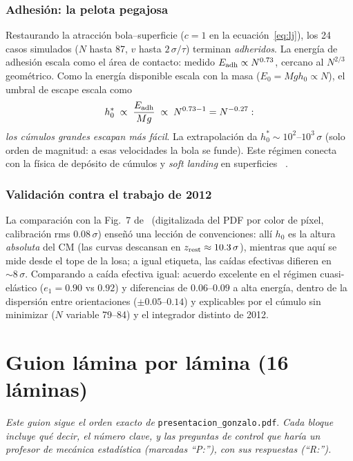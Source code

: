 \documentclass[11pt,a4paper]{article}
\begin{document}
\section{Adhesión: la pelota pegajosa}

Restaurando la atracción bola--superficie ($c=1$ en la
ecuación~\ref{eq:lj}), los 24 casos simulados ($N$ hasta 87, $v$ hasta
$2\,\sigma/\tau$) terminan \emph{adheridos}. La energía de adhesión escala
como el área de contacto: medido $E_{\rm adh} \propto N^{0.73}$, cercano al
$N^{2/3}$ geométrico. Como la energía disponible escala con la masa
($E_0 = Mgh_0 \propto N$), el umbral de escape escala como
\begin{equation}
h_0^* \;\propto\; \frac{E_{\rm adh}}{Mg} \;\propto\; N^{0.73-1} = N^{-0.27}:
\end{equation}
\emph{los cúmulos grandes escapan más fácil}. La extrapolación da
$h_0^* \sim 10^2$--$10^3\,\sigma$ (solo orden de magnitud: a esas
velocidades la bola se funde). Este régimen conecta con la física de
depósito de cúmulos y \emph{soft landing} en superficies
~\cite{Haberland1994,Awasthi2007}.

\section{Validación contra el trabajo de 2012}

La comparación con la Fig.~7 de~\cite{Gutierrez2012} (digitalizada del PDF
por color de píxel, calibración rms $0.08\,\sigma$) enseñó una lección de
convenciones: allí $h_0$ es la altura \emph{absoluta} del CM (las curvas
descansan en $z_{\rm rest}\approx10.3\,\sigma$), mientras que aquí se mide
desde el tope de la losa; a igual etiqueta, las caídas efectivas difieren
en $\sim8\,\sigma$. Comparando a caída efectiva igual: acuerdo excelente en
el régimen cuasi-elástico ($e_1 = 0.90$ vs $0.92$) y diferencias de
$0.06$--$0.09$ a alta energía, dentro de la dispersión entre orientaciones
($\pm0.05$--$0.14$) y explicables por el cúmulo sin minimizar ($N$ variable
79--84) y el integrador distinto de 2012.

\part{Guion lámina por lámina (16 láminas)}

\emph{Este guion sigue el orden exacto de} \texttt{presentacion\_gonzalo.pdf}.
\emph{Cada bloque incluye qué decir, el número clave, y las preguntas de
control que haría un profesor de mecánica estadística (marcadas ``P:''), con
sus respuestas (``R:'').}
\end{document}
